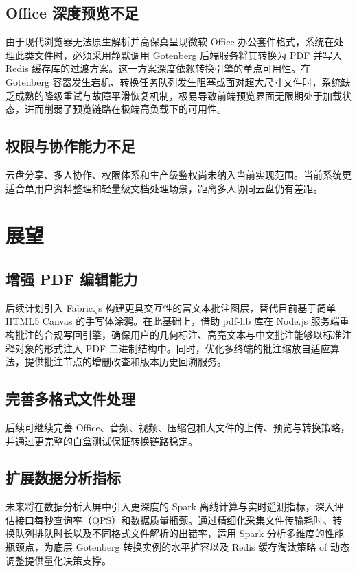 \subsection{Office 深度预览不足}

由于现代浏览器无法原生解析并高保真呈现微软 Office 办公套件格式，系统在处理此类文件时，必须采用静默调用 Gotenberg 后端服务将其转换为 PDF 并写入 Redis 缓存库的过渡方案。这一方案深度依赖转换引擎的单点可用性。在 Gotenberg 容器发生宕机、转换任务队列发生阻塞或面对超大尺寸文件时，系统缺乏成熟的降级重试与故障平滑恢复机制，极易导致前端预览界面无限期处于加载状态，进而削弱了预览链路在极端高负载下的可用性。

\subsection{权限与协作能力不足}

云盘分享、多人协作、权限体系和生产级鉴权尚未纳入当前实现范围。当前系统更适合单用户资料整理和轻量级文档处理场景，距离多人协同云盘仍有差距。

\section{展望}

\subsection{增强 PDF 编辑能力}

后续计划引入 Fabric.js 构建更具交互性的富文本批注图层，替代目前基于简单 HTML5 Canvas 的手写体涂鸦。在此基础上，借助 pdf-lib 库在 Node.js 服务端重构批注的合规写回引擎，确保用户的几何标注、高亮文本与中文批注能够以标准注释对象的形式注入 PDF 二进制结构中。同时，优化多终端的批注缩放自适应算法，提供批注节点的增删改查和版本历史回溯服务。

\subsection{完善多格式文件处理}

后续可继续完善 Office、音频、视频、压缩包和大文件的上传、预览与转换策略，并通过更完整的白盒测试保证转换链路稳定。

\subsection{扩展数据分析指标}

未来将在数据分析大屏中引入更深度的 Spark 离线计算与实时遥测指标，深入评估接口每秒查询率（QPS）和数据质量瓶颈。通过精细化采集文件传输耗时、转换队列排队时长以及不同格式文件解析的出错率，运用 Spark 分析多维度的性能瓶颈点，为底层 Gotenberg 转换实例的水平扩容以及 Redis 缓存淘汰策略 of 动态调整提供量化决策支撑。
